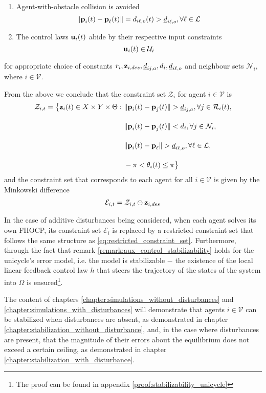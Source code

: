 \begin{problem}
\begin{enumerate}
  \item Agent-with-obstacle collision is avoided
    $$ \|\bm{\mathbf{p}}_i(t) - \bm{\mathbf{p}}_{\ell}(t)\| = d_{i\ell,o} (t) > \underline{d}_{i\ell,o},
    \forall \ell \in \mathcal{L}$$

  \item The control laws $\bm{\mathbf{u}}_i(t)$ abide by their respective input constraints
    $$\bm{\mathbf{u}}_i(t) \in \mathcal{U}_i$$
\end{enumerate}

for appropriate choice of constants
$r_i,\bm{\mathbf{z}}_{i,des},\underline{d}_{ij,a}, d_i,\underline{d}_{i\ell,o}$ and
neighbour sets $\mathcal{N}_i$, where $i \in \mathcal{V}$.
\end{problem}

From the above we conclude that the constraint set $\mathcal{Z}_i$ for
agent $i \in \mathcal{V}$ is
\begin{align}
  \mathcal{Z}_{i,t} = \big\{\bm{\mathbf{z}}_i(t) \in X \times Y \times \Theta : \
      & \|\bm{\mathbf{p}}_i(t) - \bm{\mathbf{p}}_j(t)\| > \underline{d}_{ij,a}, \forall j \in \mathcal{R}_i(t), \\[2.5ex]
      & \|\bm{\mathbf{p}}_i(t) - \bm{\mathbf{p}}_j(t)\| < d_i, \forall j \in \mathcal{N}_i, \\[2.5ex]
      & \|\bm{\mathbf{p}}_i(t) - \bm{\mathbf{p}}_{\ell}\| > \underline{d}_{i\ell,o}, \forall \ell \in \mathcal{L}, \\[2.5ex]
      & - \pi < \theta_i(t) \leq \pi \big\}
\end{align}
and the constraint set that corresponds to each agent for all
$i \in \mathcal{V}$  is given by the Minkowski difference
\begin{align}
  \mathcal{E}_{i,t} = \mathcal{Z}_{i,t} \ominus \bm{\mathbf{z}}_{i,des}
  \label{eq:error_constraint_set_unicycle}
\end{align}

In the case of additive disturbances being considered, when each agent solves
its own FHOCP, its constraint set $\mathcal{E}_i$ is replaced by a
restricted constraint set that follows the same structure as
\eqref{eq:restricted_constraint_set}. Furthermore, through the fact that
remark \eqref{remark:aux_control_stabilizability} holds for the unicycle's
error model, i.e. the model is stabilizable $-$ the existence of the
local linear feedback control law $h$ that steers the trajectory of the
states of the system into $\Omega$ is ensured\footnote{The proof can be found
in appendix \eqref{proof:stabilizability_unicycle}}.




The content of chapters \ref{chapter:simulations_without_disturbances} and
\ref{chapter:simulations_with_disturbances} will demonstrate that agents
$i \in \mathcal{V}$ can be stabilized when disturbances are absent, as
demonstrated in chapter \ref{chapter:stabilization_without_disturbance}, and,
in the case where disturbances are present, that the magnitude of their errors
about the equilibrium does not exceed a certain ceiling, as demonstrated in
chapter \ref{chapter:stabilization_with_disturbance}.
